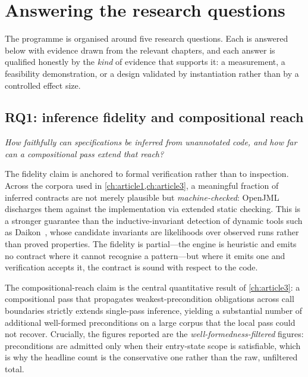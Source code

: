 \section{Answering the research questions}

The programme is organised around five research questions. Each is answered below
with evidence drawn from the relevant chapters, and each answer is qualified
honestly by the \emph{kind} of evidence that supports it: a measurement, a
feasibility demonstration, or a design validated by instantiation rather than by a
controlled effect size.

\subsection{RQ1: inference fidelity and compositional reach}

\emph{How faithfully can specifications be inferred from unannotated code, and how
far can a compositional pass extend that reach?}

The fidelity claim is anchored to formal verification rather than to inspection.
Across the corpora used in \cref{ch:article1,ch:article3}, a meaningful fraction
of inferred contracts are not merely plausible but \emph{machine-checked}: OpenJML
discharges them against the implementation via extended static checking. This is a
stronger guarantee than the inductive-invariant detection of dynamic tools such as
Daikon~\citep{ernst2007daikon}, whose candidate invariants are likelihoods over
observed runs rather than proved properties. The fidelity is partial---the engine
is heuristic and emits no contract where it cannot recognise a pattern---but
where it emits one and verification accepts it, the contract is sound with respect
to the code.

The compositional-reach claim is the central quantitative result of
\cref{ch:article3}: a compositional pass that propagates weakest-precondition
obligations across call boundaries strictly extends single-pass inference,
yielding a substantial number of additional well-formed preconditions on a large
corpus that the local pass could not recover. Crucially, the figures reported are
the \emph{well-formedness-filtered} figures: preconditions are admitted only when
their entry-state scope is satisfiable, which is why the headline count is the
conservative one rather than the raw, unfiltered total.

